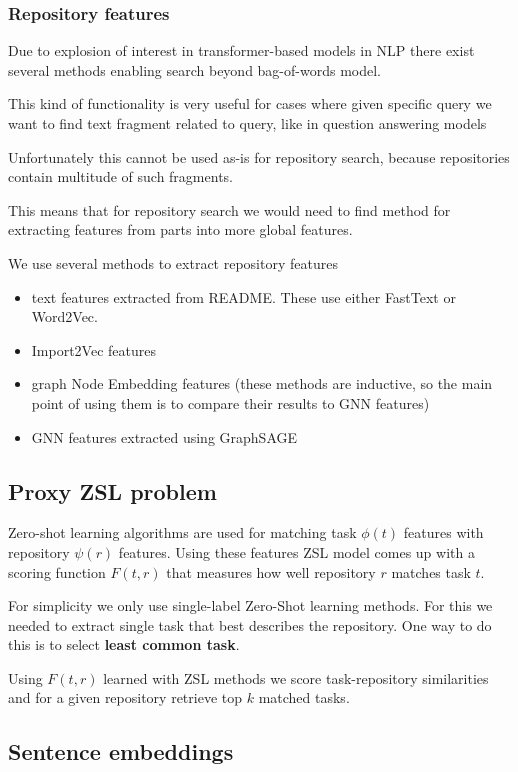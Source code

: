 \documentclass[11pt]{report}
\begin{document}
\subsubsection{Repository features}

    Due to explosion of interest in transformer-based models in NLP there exist several methods enabling search beyond bag-of-words model.

    This kind of functionality is very useful for cases where given specific query we want to find text fragment related to query, like in question answering models

Unfortunately this cannot be used as-is for repository search, because repositories contain multitude of such fragments.

This means that for repository search we would need to find method  for extracting features from parts into more global features.

We use several methods to extract repository features
\begin{itemize}
    \item text features extracted from README. These use either FastText or Word2Vec.
    \item Import2Vec features
    \item graph Node Embedding features (these methods are inductive, so the main point of using them is to compare their results to GNN features)
    \item GNN features extracted using GraphSAGE
\end{itemize}


\subsection{Proxy ZSL problem}


Zero-shot learning algorithms are used for matching task \(\phi(t)\) features with repository \(\psi(r)\) features. Using these features ZSL model comes up with a scoring function $F(t, r)$ that measures how well repository $r$ matches task $t$.

For simplicity we only use single-label Zero-Shot learning methods. For this we needed to extract single task that best describes the repository. One way to do this is to select \textbf{least common task}.

Using \(F(t, r)\) learned with ZSL methods we score task-repository similarities and for a given repository retrieve top \(k\) matched tasks.

\subsection{Sentence embeddings}
\end{document}
